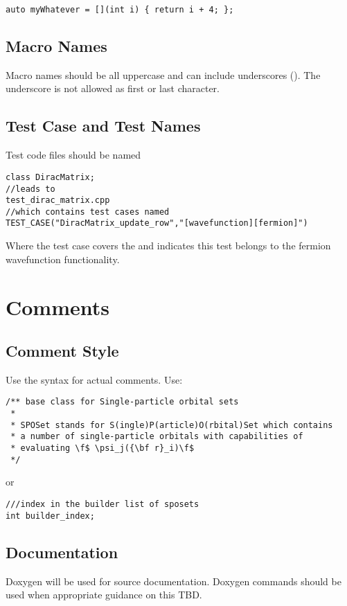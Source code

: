 \begin{lstlisting}[showspaces=false]
auto myWhatever = [](int i) { return i + 4; };
\end{lstlisting}

\subsection{Macro Names}
Macro names should be all uppercase and can include underscores (\inlinecode{_}).
The underscore is not allowed as first or last character.

\subsection{Test Case and Test Names}
Test code files should be named
\begin{lstlisting}[showspaces=false]
class DiracMatrix;
//leads to
test_dirac_matrix.cpp
//which contains test cases named
TEST_CASE("DiracMatrix_update_row","[wavefunction][fermion]")
\end{lstlisting}
Where the test case covers the  and  \inlinecode{[wavefunction][fermion]} indicates this test belongs to the fermion wavefunction functionality.

\section{Comments}
\subsection{Comment Style}
Use the  syntax for actual comments.
Use:
\begin{lstlisting}
/** base class for Single-particle orbital sets
 *
 * SPOSet stands for S(ingle)P(article)O(rbital)Set which contains
 * a number of single-particle orbitals with capabilities of
 * evaluating \f$ \psi_j({\bf r}_i)\f$
 */
\end{lstlisting}
or
\begin{lstlisting}
///index in the builder list of sposets
int builder_index;
\end{lstlisting}

\subsection{Documentation}
Doxygen will be used for source documentation. Doxygen commands should be used when appropriate guidance on this TBD.

